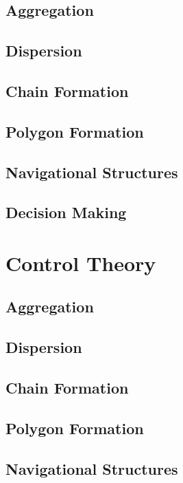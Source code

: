 \documentclass[]{article}
\begin{document}
\subsection{Aggregation}

\subsection{Dispersion}

\subsection{Chain Formation}

\subsection{Polygon Formation}

\subsection{Navigational Structures}

\subsection{Decision Making}

\section{Control Theory}

\subsection{Aggregation}

\subsection{Dispersion}

\subsection{Chain Formation}

\subsection{Polygon Formation}

\subsection{Navigational Structures}
\end{document}
